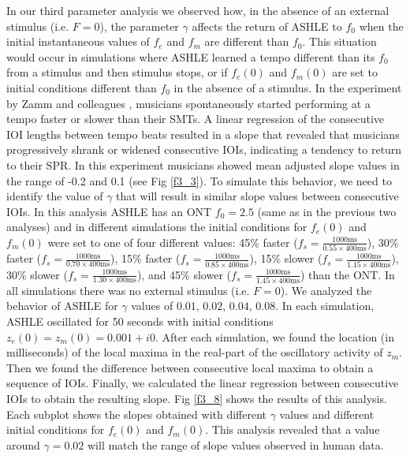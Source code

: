 \documentclass{report}
\begin{document}
In our third parameter analysis we observed how, in the absence of an external stimulus (i.e. $F = 0$), the parameter $\gamma$ affects the return of ASHLE to $f_0$ when the initial instantaneous values of $f_e$ and $f_m$ are different than $f_0$. This situation would occur in simulations where ASHLE learned a tempo different than its $f_0$ from a stimulus and then stimulus stops, or if $f_e(0)$ and $f_m(0)$ are set to initial conditions different than $f_0$ in the absence of a stimulus. In the experiment by Zamm and colleagues \cite{zamm2018musicians}, musicians spontaneously started performing at a tempo faster or slower than their SMTs. A linear regression of the consecutive IOI lengths between tempo beats resulted in a slope that revealed that musicians progressively shrank or widened consecutive IOIs, indicating a tendency to return to their SPR. In this experiment musicians showed mean adjusted slope values in the range of -0.2 and 0.1 (see Fig \ref{f3_3}). To simulate this behavior, we need to identify the value of $\gamma$ that will result in similar slope values between consecutive IOIs. In this analysis ASHLE has an ONT $f_0= 2.5$ (same as in the previous two analyses) and in different simulations the initial conditions for $f_e(0)$ and $f_m(0)$ were set to one of four different values: 45\% faster ($f_s = \frac{1000\text{ms}}{0.55 \times 400\text{ms}}$), 30\% faster ($f_s = \frac{1000\text{ms}}{0.70 \times 400\text{ms}}$), 15\% faster ($f_s = \frac{1000\text{ms}}{0.85 \times 400\text{ms}}$), 15\% slower ($f_s = \frac{1000\text{ms}}{1.15 \times 400\text{ms}}$), 30\% slower ($f_s = \frac{1000\text{ms}}{1.30 \times 400\text{ms}}$), and 45\% slower ($f_s = \frac{1000\text{ms}}{1.45 \times 400\text{ms}}$) than the ONT. In all simulations there was no external stimulus (i.e. $F = 0$). We analyzed the behavior of ASHLE for $\gamma$ values of $0.01$, $0.02$, $0.04$, $0.08$. In each simulation, ASHLE oscillated for 50 seconds with initial conditions $z_e(0)=z_m(0)=0.001 + i0$. After each simulation, we found the location (in milliseconds) of the local maxima in the real-part of the oscillatory activity of $z_m$. Then we found the difference between consecutive local maxima to obtain a sequence of IOIs. Finally, we calculated the linear regression between consecutive IOIs to obtain the resulting slope. Fig \ref{f3_8} shows the results of this analysis. Each subplot shows the slopes obtained with different $\gamma$ values and different initial conditions for $f_e(0)$ and $f_m(0)$. This analysis revealed that a value around $\gamma= 0.02$ will match the range of slope values observed in human data.
\end{document}
